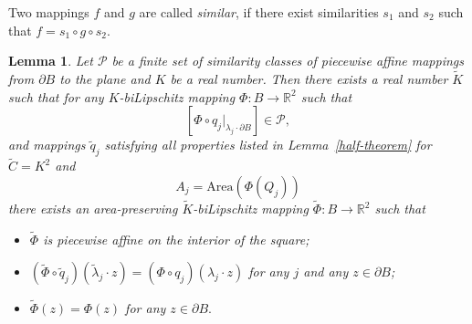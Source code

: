 \documentclass[12pt]{article}
\newtheorem{lemm}[prop]{Lemma}
\theoremstyle{definition}
\begin{document}
Two mappings $f$ and $g$ are called {\it similar}, if there exist similarities $s_1$ and $s_2$ such that $f = s_1\circ g \circ s_2.$

\begin{lemm}
\label{areafication}
Let $\mathcal P$ be a finite set of similarity classes of piecewise affine mappings from $\partial B$ to the plane and $K$ be a real number. Then there exists a real number $\widetilde K$ such that for any $K$-biLipschitz mapping $\Phi:B\to\mathbb R^2$ such that
$$\left[\Phi\circ q_j\big|_{\lambda_j\cdot\partial B}\right]\in\mathcal P,$$
and mappings $\widetilde q_j$ satisfying all properties listed in Lemma~\ref{half-theorem} for $\widetilde C = K^2$ and
$$A_j = \mathrm{Area}(\Phi(Q_j))$$
there exists an area-preserving $\widetilde K$-biLipschitz mapping $\widetilde\Phi:B\to\mathbb R^2$ such that
\begin{itemize}
\item
$\widetilde\Phi$ is piecewise affine on the interior of the square;
\item
$
\left(\widetilde\Phi\circ\widetilde q_j\right) (\widetilde \lambda_j\cdot z) = 
\left(\Phi\circ q_j\right) ( \lambda_j\cdot z)$
for any $j$ and any $z\in\partial B$;
\item
$\widetilde\Phi(z) = \Phi(z)$ for any $z\in\partial B.$
\end{itemize}
\end{lemm}
\end{document}
